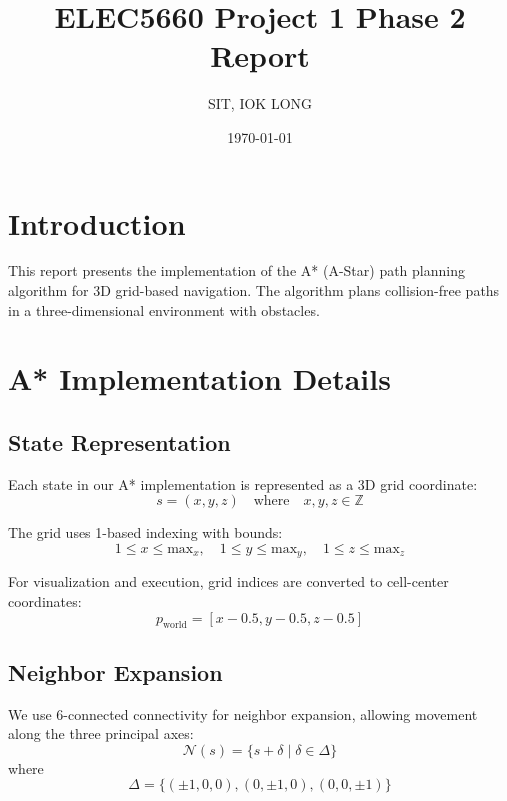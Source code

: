 \documentclass[11pt]{article}
\title{ELEC5660 Project 1 Phase 2 Report}
\author{SIT, IOK LONG}
\date{\today}
\begin{document}
\maketitle

\section{Introduction}

This report presents the implementation of the A* (A-Star) path planning algorithm for 3D grid-based navigation. The algorithm plans collision-free paths in a three-dimensional environment with obstacles.

\section{A* Implementation Details}

\subsection{State Representation}

Each state in our A* implementation is represented as a 3D grid coordinate:
\begin{equation}
    s = (x, y, z) \quad \text{where} \quad x, y, z \in \mathbb{Z}
\end{equation}

The grid uses 1-based indexing with bounds:
\begin{equation}
    1 \leq x \leq \text{max}_x, \quad 1 \leq y \leq \text{max}_y, \quad 1 \leq z \leq \text{max}_z
\end{equation}

For visualization and execution, grid indices are converted to cell-center coordinates:
\begin{equation}
    p_{\text{world}} = [x - 0.5, y - 0.5, z - 0.5]
\end{equation}

\subsection{Neighbor Expansion}

We use 6-connected connectivity for neighbor expansion, allowing movement along the three principal axes:
\begin{equation}
    \mathcal{N}(s) = \{s + \delta \mid \delta \in \Delta\}
\end{equation}
where
\begin{equation}
    \Delta = \{
    (\pm 1, 0, 0), 
    (0, \pm 1, 0), 
    (0, 0, \pm 1)
    \}
\end{equation}
\end{document}
